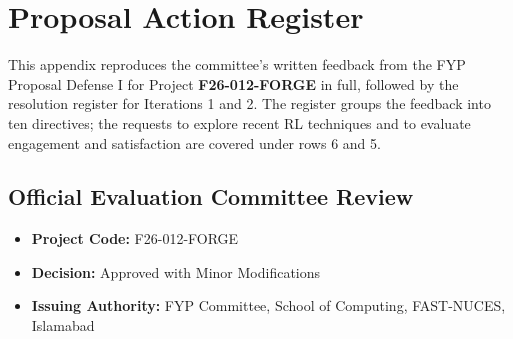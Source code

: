 \chapter{Proposal Action Register}
\label{app:action_reg}

This appendix reproduces the committee's written feedback from the FYP Proposal Defense I for Project \textbf{F26-012-FORGE} in full, followed by the resolution register for Iterations 1 and 2. The register groups the feedback into ten directives; the requests to explore recent RL techniques and to evaluate engagement and satisfaction are covered under rows 6 and 5.

\section*{Official Evaluation Committee Review}
\begin{itemize}
    \item \textbf{Project Code:} F26-012-FORGE
    \item \textbf{Decision:} Approved with Minor Modifications
    \item \textbf{Issuing Authority:} FYP Committee, School of Computing, FAST-NUCES, Islamabad
\end{itemize}

